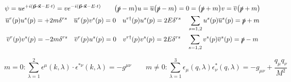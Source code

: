 \begin{gather*}
        \psi
        = ue^{+i\qty(\va{p}\vdot\va{x} - E\cdot t)}
        = ve^{-i\qty(\va{p}\vdot\va{x} - E\cdot t)}
        \qquad
        \qty(\slashed{p}-m)u
        = \overline{u}\qty(\slashed{p}-m)
        = 0
        =
        \qty(\slashed{p}+m)v
        = \overline{v}\qty(\slashed{p}+m)
        \\
        \overline{u}^r(p)u^s(p) = +2m\delta^{rs}
        \quad
        \overline{u}^r(p)v^s(p) = 0
        \quad
        u^{r\dagger}(p)u^s(p) = 2E\delta^{rs}
        \quad
        \sum_{s=1,2}u^s(p)\overline{u}^s(p) = \slashed{p} + m
        \\
        \overline{v}^r(p)v^s(p) = -2m\delta^{rs}
        \quad
        \overline{v}^r(p)u^s(p) = 0
        \quad
        v^{r\dagger}(p)v^s(p) = 2E\delta^{rs}
        \quad
        \sum_{s=1,2}v^s(p)\overline{v}^s(p) = \slashed{p} - m
\end{gather*}

\begin{equation*}
        m=0:
        \sum_{\lambda=1}^{2} \epsilon^{\mu}(k,\lambda) \cdot \epsilon^{*\nu}(k,\lambda) = -g^{\mu\nu}
        \qquad
        m\neq0:
        \sum_{\lambda=1}^{3} \epsilon_\mu(q,\lambda)\epsilon^*_\nu(q,\lambda)
        = -g_{\mu\nu} + \frac{q_\mu q_\nu}{M^2}
\end{equation*}
